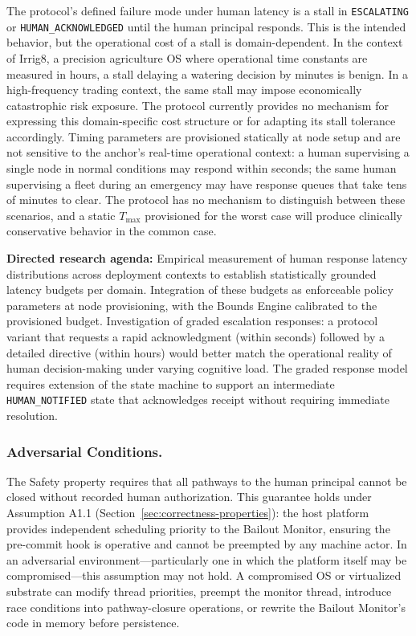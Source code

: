 The protocol's defined failure mode under human latency is a stall in \texttt{ESCALATING} or \texttt{HUMAN\_ACKNOWLEDGED} until the human principal responds. This is the intended behavior, but the operational cost of a stall is domain-dependent. In the context of Irrig8, a precision agriculture OS where operational time constants are measured in hours, a stall delaying a watering decision by minutes is benign. In a high-frequency trading context, the same stall may impose economically catastrophic risk exposure. The protocol currently provides no mechanism for expressing this domain-specific cost structure or for adapting its stall tolerance accordingly. Timing parameters are provisioned statically at node setup and are not sensitive to the anchor's real-time operational context: a human supervising a single node in normal conditions may respond within seconds; the same human supervising a fleet during an emergency may have response queues that take tens of minutes to clear. The protocol has no mechanism to distinguish between these scenarios, and a static $T_{\max}$ provisioned for the worst case will produce clinically conservative behavior in the common case.

\textbf{Directed research agenda:} Empirical measurement of human response latency distributions across deployment contexts to establish statistically grounded latency budgets per domain. Integration of these budgets as enforceable policy parameters at node provisioning, with the Bounds Engine calibrated to the provisioned budget. Investigation of graded escalation responses: a protocol variant that requests a rapid acknowledgment (within seconds) followed by a detailed directive (within hours) would better match the operational reality of human decision-making under varying cognitive load. The graded response model requires extension of the state machine to support an intermediate \texttt{HUMAN\_NOTIFIED} state that acknowledges receipt without requiring immediate resolution.

\subsubsection{Adversarial Conditions.}\label{sec:lim-adversarial}

The Safety property requires that all pathways to the human principal cannot be closed without recorded human authorization. This guarantee holds under Assumption A1.1 (Section~\ref{sec:correctness-properties}): the host platform provides independent scheduling priority to the Bailout Monitor, ensuring the pre-commit hook is operative and cannot be preempted by any machine actor. In an adversarial environment---particularly one in which the platform itself may be compromised---this assumption may not hold. A compromised OS or virtualized substrate can modify thread priorities, preempt the monitor thread, introduce race conditions into pathway-closure operations, or rewrite the Bailout Monitor's code in memory before persistence.

